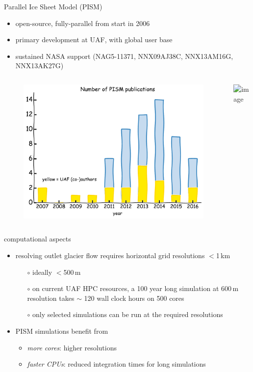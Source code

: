 \documentclass[hide notes,intlimits]{beamer}
\begin{document}
{
%
}


\begin{frame}{Parallel Ice Sheet Model (PISM)}
  \begin{itemize}
  \item open-source, fully-parallel from start in 2006
  \item primary development at UAF, with global user base
  \item sustained NASA support \tiny (NAG5-11371, NNX09AJ38C, NNX13AM16G, NNX13AK27G)
  \end{itemize}
  \begin{columns}
    \column[c]{4.75cm}
    \begin{figure}
      \includegraphics[width=\textwidth]{pism-uaf-publications}
    \end{figure}
    \column[c]{6.25cm}
    \includegraphics<1>[width=\textwidth]{pism-users}
  \end{columns}
\end{frame}


\begin{frame}{computational aspects}
  
  \begin{itemize}
  \item resolving outlet glacier flow requires horizontal grid resolutions $<$1\,km
       \begin{itemize}
       \item[$\circ$] ideally $<$500\,m
       \item[$\circ$] on current UAF HPC resources, a 100 year long simulation at 600\,m resolution takes $\sim$ 120 wall clock hours on 500 cores
       \item[$\circ$] only selected simulations can be run at the required resolutions
       \end{itemize}
  \item PISM simulations benefit from
    \begin{itemize}
    \item \emph{more cores}: higher resolutions
    \item \emph{faster CPUs}: reduced integration times for long simulations
    \end{itemize}
\end{itemize}
\end{frame}
\end{document}
